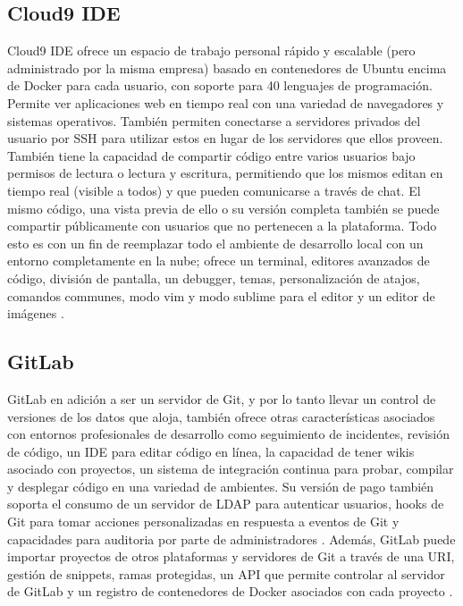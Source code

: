 \subsection{Cloud9 IDE}
Cloud9 IDE ofrece un espacio de trabajo personal rápido y escalable (pero administrado por la misma empresa) basado en contenedores de Ubuntu encima de Docker para cada usuario, con soporte para 40 lenguajes de programación. Permite ver aplicaciones web en tiempo real con una variedad de navegadores y sistemas operativos. También permiten conectarse a servidores privados del usuario por SSH para utilizar estos en lugar de los servidores que ellos proveen. También tiene la capacidad de compartir código entre varios usuarios bajo permisos de lectura o lectura y escritura, permitiendo que los mismos editan en tiempo real (visible a todos) y que pueden comunicarse a través de chat. El mismo código, una vista previa de ello o su versión completa también se puede compartir públicamente con usuarios que no pertenecen a la plataforma. Todo esto es con un fin de reemplazar todo el ambiente de desarrollo local con un entorno completamente en la nube; ofrece un terminal, editores avanzados de código, división de pantalla, un debugger, temas, personalización de atajos, comandos communes, modo vim y modo sublime para el editor y un editor de imágenes \citep{Cloud9-Home}.

\subsection{GitLab}
GitLab en adición a ser un servidor de Git, y por lo tanto llevar un control de versiones de los datos que aloja, también ofrece otras características asociados con entornos profesionales de desarrollo como seguimiento de incidentes, revisión de código, un IDE para editar código en línea, la capacidad de tener wikis asociado con proyectos, un sistema de integración continua para probar, compilar y desplegar código en una variedad de ambientes. Su versión de pago también soporta el consumo de un servidor de LDAP para autenticar usuarios, hooks de Git para tomar acciones personalizadas en respuesta a eventos de Git y capacidades para auditoria por parte de administradores \citep{GitLab}. Además, GitLab puede importar proyectos de otros plataformas y servidores de Git a través de una URI, gestión de snippets, ramas protegidas, un API que permite controlar al servidor de GitLab y un registro de contenedores de Docker asociados con cada proyecto \citep{GitLab-Features}.

